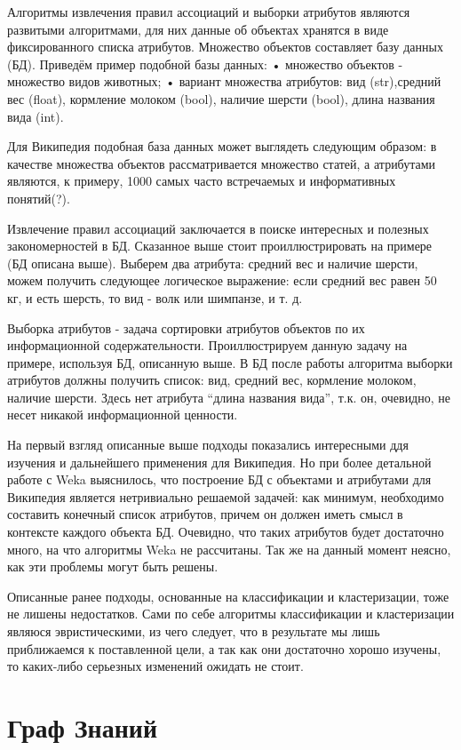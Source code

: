 Алгоритмы извлечения правил ассоциаций и выборки атрибутов являются развитыми алгоритмами,
для них данные об объектах хранятся в виде фиксированного списка атрибутов. Множество объектов
составляет базу данных (БД). Приведём пример подобной базы данных:
•	множество объектов - множество видов животных;
•	вариант множества атрибутов: вид (str),средний вес (float), кормление молоком (bool),
наличие шерсти (bool), длина названия вида (int).

Для Википедия подобная база данных может выглядеть следующим образом: в качестве множества
объектов рассматривается множество статей, а атрибутами являются, к примеру, 1000 самых часто
встречаемых и информативных понятий(?). 

Извлечение правил ассоциаций заключается в поиске интересных и полезных закономерностей в БД.
Сказанное выше стоит проиллюстрировать на примере (БД описана выше). Выберем два атрибута: средний 
вес и наличие шерсти, можем получить следующее логическое выражение: если средний вес равен 
50 кг, и есть шерсть, то вид - волк или шимпанзе, и т. д.

Выборка атрибутов - задача сортировки атрибутов объектов по их информационной содержательности.
Проиллюстрируем данную задачу на примере, используя БД, описанную выше. В БД после работы 
алгоритма выборки атрибутов должны получить список: вид, средний вес, кормление молоком, 
наличие шерсти. Здесь нет атрибута “длина названия вида”, т.к. он, очевидно, не несет
никакой информационной ценности.

На первый взгляд описанные выше подходы показались интересными ддя изучения и дальнейшего
применения для Википедия. Но при более детальной работе с Weka выяснилось, что
построение БД с объектами и атрибутами для Википедия является нетривиально решаемой задачей:
как минимум, необходимо составить конечный список атрибутов, причем он должен иметь смысл 
в контексте каждого объекта БД. Очевидно, что таких атрибутов будет достаточно много,
на что алгоритмы Weka не рассчитаны. Так же на данный момент неясно, как эти проблемы
могут быть решены.

Описанные ранее подходы, основанные на классификации и кластеризации, тоже не лишены недостатков.
Сами по себе алгоритмы классификации и кластеризации являюся эвристическими, из чего следует, что
в результате мы лишь приближаемся к поставленной цели, а так как они достаточно хорошо изучены, то 
каких-либо серьезных изменений ожидать не стоит.

\section {Граф Знаний}

